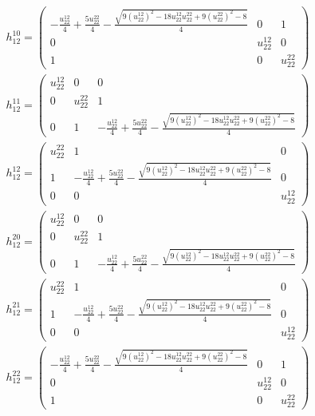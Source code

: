 \documentclass[a4paper, 11pt, twoside, onecolumn]{article}
\begin{document}
\begin{landscape}
\begin{gather*}
	 h_12^{10}=\begin{pmatrix}- \frac{u^{12}_{22}}{4} + \frac{5 u^{22}_{22}}{4} - \frac{\sqrt{9 \left(u^{12}_{22}\right)^{2} - 18 u^{12}_{22} u^{22}_{22} + 9 \left(u^{22}_{22}\right)^{2} - 8}}{4} & 0 & 1\\0 & u^{12}_{22} & 0\\1 & 0 & u^{22}_{22}\end{pmatrix}\\ 
	 h_12^{11}=\begin{pmatrix}u^{12}_{22} & 0 & 0\\0 & u^{22}_{22} & 1\\0 & 1 & - \frac{u^{12}_{22}}{4} + \frac{5 u^{22}_{22}}{4} - \frac{\sqrt{9 \left(u^{12}_{22}\right)^{2} - 18 u^{12}_{22} u^{22}_{22} + 9 \left(u^{22}_{22}\right)^{2} - 8}}{4}\end{pmatrix}\\ 
	 h_12^{12}=\begin{pmatrix}u^{22}_{22} & 1 & 0\\1 & - \frac{u^{12}_{22}}{4} + \frac{5 u^{22}_{22}}{4} - \frac{\sqrt{9 \left(u^{12}_{22}\right)^{2} - 18 u^{12}_{22} u^{22}_{22} + 9 \left(u^{22}_{22}\right)^{2} - 8}}{4} & 0\\0 & 0 & u^{12}_{22}\end{pmatrix}\\ 
	 h_12^{20}=\begin{pmatrix}u^{12}_{22} & 0 & 0\\0 & u^{22}_{22} & 1\\0 & 1 & - \frac{u^{12}_{22}}{4} + \frac{5 u^{22}_{22}}{4} - \frac{\sqrt{9 \left(u^{12}_{22}\right)^{2} - 18 u^{12}_{22} u^{22}_{22} + 9 \left(u^{22}_{22}\right)^{2} - 8}}{4}\end{pmatrix}\\ 
	 h_12^{21}=\begin{pmatrix}u^{22}_{22} & 1 & 0\\1 & - \frac{u^{12}_{22}}{4} + \frac{5 u^{22}_{22}}{4} - \frac{\sqrt{9 \left(u^{12}_{22}\right)^{2} - 18 u^{12}_{22} u^{22}_{22} + 9 \left(u^{22}_{22}\right)^{2} - 8}}{4} & 0\\0 & 0 & u^{12}_{22}\end{pmatrix}\\ 
	 h_12^{22}=\begin{pmatrix}- \frac{u^{12}_{22}}{4} + \frac{5 u^{22}_{22}}{4} - \frac{\sqrt{9 \left(u^{12}_{22}\right)^{2} - 18 u^{12}_{22} u^{22}_{22} + 9 \left(u^{22}_{22}\right)^{2} - 8}}{4} & 0 & 1\\0 & u^{12}_{22} & 0\\1 & 0 & u^{22}_{22}\end{pmatrix}\\ 

\end{gather*}
\end{landscape}
\end{document}
